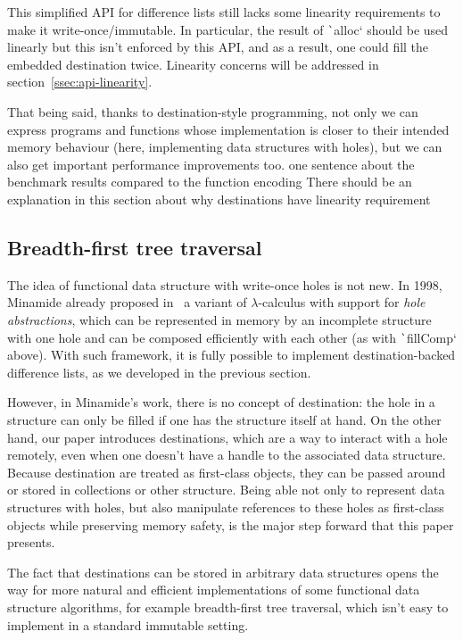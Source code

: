 \documentclass[english]{jflart}
\newcommand{\TODO}[1]{{\color{red}\large #1}}
\begin{document}
This simplified API for difference lists still lacks some linearity requirements to make it write-once/immutable. In particular, the result of \texttt`alloc` should be used linearly but this isn't enforced by this API, and as a result, one could fill the embedded destination twice. Linearity concerns will be addressed in section~\ref{ssec:api-linearity}.

That being said, thanks to destination-style programming, not only we can express programs and functions whose implementation is closer to their intended memory behaviour (here, implementing data structures with holes), but we can also get important performance improvements too. \TODO{one sentence about the benchmark results compared to the function encoding}
\TODO{There should be an explanation in this section about why destinations have linearity requirement}

\subsection{Breadth-first tree traversal}\label{ssec:bf-tree-traversal}

The idea of functional data structure with write-once holes is not new. In 1998, Minamide already proposed in~\cite{minamide_functional_1998} a variant of $\lambda$-calculus with support for \emph{hole abstractions}, which can be represented in memory by an incomplete structure with one hole and can be composed efficiently with each other (as with \texttt`fillComp` above). With such framework, it is fully possible to implement destination-backed difference lists, as we developed in the previous section.

However, in Minamide's work, there is no concept of destination: the hole in a structure can only be filled if one has the structure itself at hand. On the other hand, our paper introduces destinations, which are a way to interact with a hole remotely, even when one doesn't have a handle to the associated data structure. Because destination are treated as first-class objects, they can be passed around or stored in collections or other structure. Being able not only to represent data structures with holes, but also manipulate references to these holes as first-class objects while preserving memory safety, is the major step forward that this paper presents.

The fact that destinations can be stored in arbitrary data structures opens the way for more natural and efficient implementations of some functional data structure algorithms, for example breadth-first tree traversal, which isn't easy to implement in a standard immutable setting.
\end{document}
